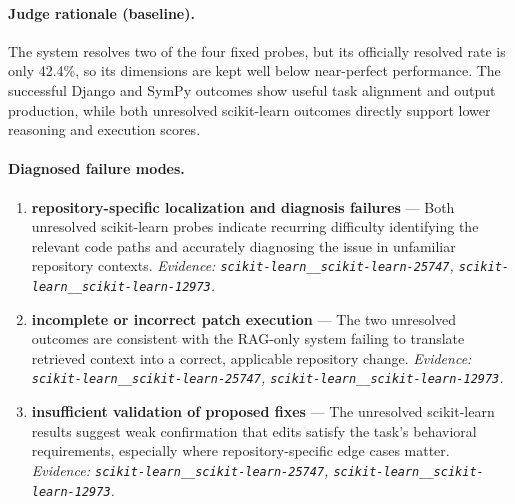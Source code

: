 \paragraph{Judge rationale (baseline).}
The system resolves two of the four fixed probes, but its officially resolved rate is only 42.4\%, so its dimensions are kept well below near-perfect performance. The successful Django and SymPy outcomes show useful task alignment and output production, while both unresolved scikit-learn outcomes directly support lower reasoning and execution scores.
\paragraph{Diagnosed failure modes.}\begin{enumerate}\itemsep1pt
\item \textbf{repository-specific localization and diagnosis failures} --- Both unresolved scikit-learn probes indicate recurring difficulty identifying the relevant code paths and accurately diagnosing the issue in unfamiliar repository contexts. \emph{Evidence: \texttt{scikit-learn\_\_scikit-learn-25747}, \texttt{scikit-learn\_\_scikit-learn-12973}.}
\item \textbf{incomplete or incorrect patch execution} --- The two unresolved outcomes are consistent with the RAG-only system failing to translate retrieved context into a correct, applicable repository change. \emph{Evidence: \texttt{scikit-learn\_\_scikit-learn-25747}, \texttt{scikit-learn\_\_scikit-learn-12973}.}
\item \textbf{insufficient validation of proposed fixes} --- The unresolved scikit-learn results suggest weak confirmation that edits satisfy the task's behavioral requirements, especially where repository-specific edge cases matter. \emph{Evidence: \texttt{scikit-learn\_\_scikit-learn-25747}, \texttt{scikit-learn\_\_scikit-learn-12973}.}
\end{enumerate}
